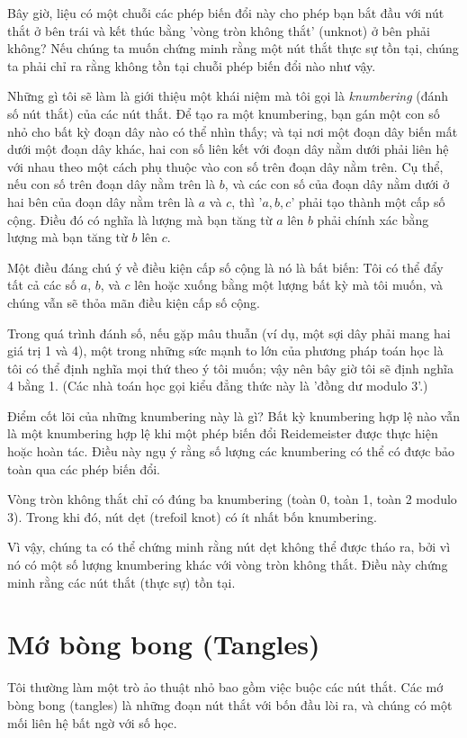 \documentclass[12pt,a4paper]{article}
\begin{document}
Bây giờ, liệu có một chuỗi các phép biến đổi này cho phép bạn bắt đầu với nút thắt ở bên trái và kết thúc bằng 'vòng tròn không thắt' (unknot) ở bên phải không? Nếu chúng ta muốn chứng minh rằng một nút thắt thực sự tồn tại, chúng ta phải chỉ ra rằng không tồn tại chuỗi phép biến đổi nào như vậy.

Những gì tôi sẽ làm là giới thiệu một khái niệm mà tôi gọi là \textit{knumbering} (đánh số nút thắt) của các nút thắt. Để tạo ra một knumbering, bạn gán một con số nhỏ cho bất kỳ đoạn dây nào có thể nhìn thấy; và tại nơi một đoạn dây biến mất dưới một đoạn dây khác, hai con số liên kết với đoạn dây nằm dưới phải liên hệ với nhau theo một cách phụ thuộc vào con số trên đoạn dây nằm trên. Cụ thể, nếu con số trên đoạn dây nằm trên là $b$, và các con số của đoạn dây nằm dưới ở hai bên của đoạn dây nằm trên là $a$ và $c$, thì '$a, b, c$' phải tạo thành một cấp số cộng. Điều đó có nghĩa là lượng mà bạn tăng từ $a$ lên $b$ phải chính xác bằng lượng mà bạn tăng từ $b$ lên $c$.

Một điều đáng chú ý về điều kiện cấp số cộng là nó là bất biến: Tôi có thể đẩy tất cả các số $a$, $b$, và $c$ lên hoặc xuống bằng một lượng bất kỳ mà tôi muốn, và chúng vẫn sẽ thỏa mãn điều kiện cấp số cộng.

Trong quá trình đánh số, nếu gặp mâu thuẫn (ví dụ, một sợi dây phải mang hai giá trị 1 và 4), một trong những sức mạnh to lớn của phương pháp toán học là tôi có thể định nghĩa mọi thứ theo ý tôi muốn; vậy nên bây giờ tôi sẽ định nghĩa 4 bằng 1. (Các nhà toán học gọi kiểu đẳng thức này là 'đồng dư modulo 3'.)

Điểm cốt lõi của những knumbering này là gì? Bất kỳ knumbering hợp lệ nào vẫn là một knumbering hợp lệ khi một phép biến đổi Reidemeister được thực hiện hoặc hoàn tác. Điều này ngụ ý rằng số lượng các knumbering có thể có được bảo toàn qua các phép biến đổi.

Vòng tròn không thắt chỉ có đúng ba knumbering (toàn 0, toàn 1, toàn 2 modulo 3).
Trong khi đó, nút dẹt (trefoil knot) có ít nhất bốn knumbering.

Vì vậy, chúng ta có thể chứng minh rằng nút dẹt không thể được tháo ra, bởi vì nó có một số lượng knumbering khác với vòng tròn không thắt. Điều này chứng minh rằng các nút thắt (thực sự) tồn tại.

\section*{Mớ bòng bong (Tangles)}
Tôi thường làm một trò ảo thuật nhỏ bao gồm việc buộc các nút thắt. Các mớ bòng bong (tangles) là những đoạn nút thắt với bốn đầu lòi ra, và chúng có một mối liên hệ bất ngờ với số học.
\end{document}
